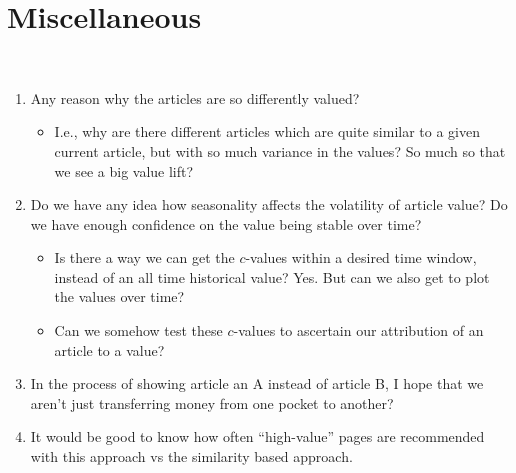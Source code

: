 \documentclass[11]{article}
\begin{document}
\section{Miscellaneous}
\\
\begin{enumerate}
\item Any reason why the articles are so differently valued?
\begin{itemize}
\item I.e., why are there different articles which are quite similar to a given current article, but with so much variance in the values? So much so that we see a big value  lift?
\end{itemize}
\item Do we have any idea how seasonality affects the volatility of article value?  Do we have enough confidence on the value being stable over time? 
\begin{itemize}
\item Is there a way we can get the $c$-values within a desired time window, instead of an all time historical value? Yes. But can we also get to plot the values over time? 
\item Can we somehow test these $c$-values to ascertain our attribution of an article to a value? 
\end{itemize}
\item In the process of showing article an A instead of article B, I hope that we aren't just transferring money from one pocket to another?
\item \text{[Do analysis]} It would be good to know how often “high-value” pages are recommended with this approach vs the similarity based approach.


\end{enumerate}


\end{document}
